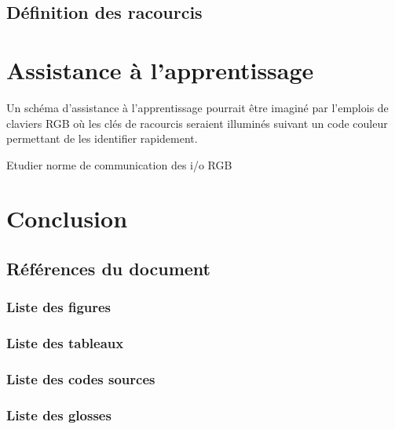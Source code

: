 \documentclass[a4paper,12pt]{article}
\begin{document}
\subsection{Définition des racourcis}
\label{sec:orgdb21dda}
\section{Assistance à l'apprentissage}
\label{sec:orga03c0f6}
Un schéma d'assistance à l'apprentissage pourrait être imaginé par l'emplois de claviers RGB où les clés de racourcis seraient illuminés suivant un code couleur permettant de les identifier rapidement.

Etudier norme de communication des i/o RGB
\section{Conclusion}
\label{sec:org0832911}

\clearpage
\subsection{Références du document}
\label{sec:org9a4674e}
\subsubsection{Liste des figures}
\label{sec:orga9af9d5}
\renewcommand{\listfigurename}{\vspace{-2em}}
\listoffigures
\subsubsection{Liste des tableaux}
\label{sec:org754dc69}
\renewcommand{\listtablename}{\vspace{-2em}}
\listoftables
\subsubsection{Liste des codes sources}
\label{sec:org4b828f8}
\renewcommand{\lstlistingname}{\vspace{-2em}}
\lstlistoflistings
\subsubsection{Liste des glosses}
\label{sec:org98be5c9}
\begin{multicols}{2}\small{

}\end{multicols}
\end{document}
